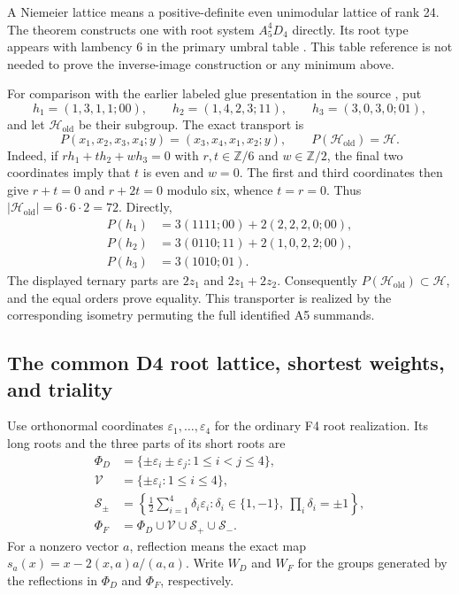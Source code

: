 A Niemeier lattice means a positive-definite even unimodular lattice of
rank 24.  The theorem constructs one with root system \(A_5^4D_4\)
directly.  Its root type appears with lambency 6 in the primary umbral
table \cite[Table~3, p.~21]{esn:CDH2014}.  This table reference is not
needed to prove the inverse-image construction or any minimum above.

For comparison with the earlier labeled glue presentation in the source
\cite{esn:ESMain2026,esn:Provenance}, put
\[
 h_1=(1,3,1,1;00),\qquad h_2=(1,4,2,3;11),\qquad
 h_3=(3,0,3,0;01),
\]
and let \(\mathcal H_{\mathrm{old}}\) be their subgroup.  The exact
transport is
\begin{equation}
 P(x_1,x_2,x_3,x_4;y)=(x_3,x_4,x_1,x_2;y),\qquad
 P(\mathcal H_{\mathrm{old}})=\mathcal H.
 \label{esn:eq:old-code-transporter}
\end{equation}
Indeed, if \(rh_1+th_2+wh_3=0\) with \(r,t\in\mathbb Z/6\)
and \(w\in\mathbb Z/2\), the final two coordinates imply that \(t\)
is even and \(w=0\).  The first and third coordinates then give
\(r+t=0\) and \(r+2t=0\) modulo six, whence \(t=r=0\).
Thus \(|\mathcal H_{\mathrm{old}}|=6\cdot6\cdot2=72\).  Directly,
\[
\begin{split}
 P(h_1)&=3(1111;00)+2(2,2,2,0;00),\\
 P(h_2)&=3(0110;11)+2(1,0,2,2;00),\\
 P(h_3)&=3(1010;01).
\end{split}
\]
The displayed ternary parts are \(2z_1\) and \(2z_1+2z_2\).
Consequently \(P(\mathcal H_{\mathrm{old}})\subset\mathcal H\),
and the equal orders prove equality.  This transporter is realized by
the corresponding isometry permuting the full identified A5 summands.

\subsection{The common D4 root lattice, shortest weights, and triality}
\label{esn:subsec:d4-flag}

Use orthonormal coordinates \(\varepsilon_1,\ldots,\varepsilon_4\)
for the ordinary F4 root realization.  Its long roots and the three
parts of its short roots are
\begin{equation}
\begin{split}
 \Phi_D&=\{\pm\varepsilon_i\pm\varepsilon_j:1\le i<j\le4\},\\
 \mathcal V&=\{\pm\varepsilon_i:1\le i\le4\},\\
 \mathcal S_\pm&=
 \left\{\frac12\sum_{i=1}^4\delta_i\varepsilon_i:
          \delta_i\in\{1,-1\},\ \prod_i\delta_i=\pm1\right\},\\
 \Phi_F&=\Phi_D\cup\mathcal V\cup\mathcal S_+\cup\mathcal S_-.
\end{split}
 \label{esn:eq:root-weight-sets}
\end{equation}
For a nonzero vector \(a\), reflection means the exact map
\(s_a(x)=x-2(x,a)a/(a,a)\).  Write \(W_D\) and \(W_F\) for the
groups generated by the reflections in \(\Phi_D\) and \(\Phi_F\),
respectively.

